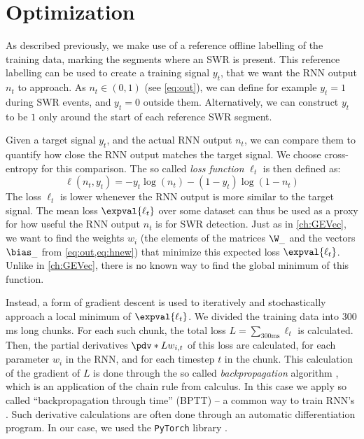 \section{Optimization}
\label{sec:RNN-optim}

As described previously, we make use of a reference offline labelling of the training data, marking the segments where an SWR is present. This reference labelling can be used to create a training signal $y_t$, that we want the RNN output $n_t$ to approach. As $n_t \in (0, 1)$ (see \cref{eq:out}), we can define for example $y_t = 1$ during SWR events, and $y_t = 0$ outside them. Alternatively, we can construct $y_t$ to be $1$ only around the start of each reference SWR segment.

Given a target signal $y_t$, and the actual RNN output $n_t$, we can compare them to quantify how close the RNN output matches the target signal. We choose cross-entropy for this comparison. The so called \emph{loss function} $\ell_t$ is then defined as:
%
\begin{equation}
\label{eq:loss}
\ell(n_t, y_t) = - y_t \log(n_t) - (1 - y_t) \log(1 - n_t)
\end{equation}
%
The loss $\ell_t$ is lower whenever the RNN output is more similar to the target signal. The mean loss $\expval{\ell_t}$ over some dataset can thus be used as a proxy for how useful the RNN output $n_t$ is for SWR detection. Just as in \cref{ch:GEVec}, we want to find the weights $w_i$ (the elements of the matrices $\W_\_$ and the vectors $\bias_\_$ from \cref{eq:out,eq:hnew}) that minimize this expected loss $\expval{\ell_t}$. Unlike in \cref{ch:GEVec}, there is no known way to find the global minimum of this function.

Instead, a form of gradient descent is used to iteratively and stochastically approach a local minimum of $\expval{\ell_t}$. We divided the training data into 300 ms long chunks. For each such chunk, the total loss $L = \sum_{300 \text{ms}} \ell_t$ is calculated. Then, the partial derivatives $\pdv*{L}{w_{i,t}}$ of this loss are calculated, for each parameter $w_i$ in the RNN, and for each timestep $t$ in the chunk. This calculation of the gradient of $L$ is done through the so called \emph{backpropagation} algorithm \cite{Rumelhart1986}, which is an application of the chain rule from calculus. In this case we apply so called ``backpropagation through time'' (BPTT) -- a common way to train RNN's \cite{Goodfellow2016}. Such derivative calculations are often done through an automatic differentiation program. In our case, we used the \texttt{PyTorch} library \cite{Paszke2017}.

